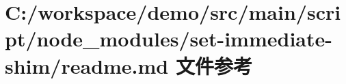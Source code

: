 \hypertarget{node__modules_2set-immediate-shim_2_r_e_a_d_m_e_8md}{}\section{C\+:/workspace/demo/src/main/script/node\+\_\+modules/set-\/immediate-\/shim/readme.md 文件参考}
\label{node__modules_2set-immediate-shim_2_r_e_a_d_m_e_8md}
